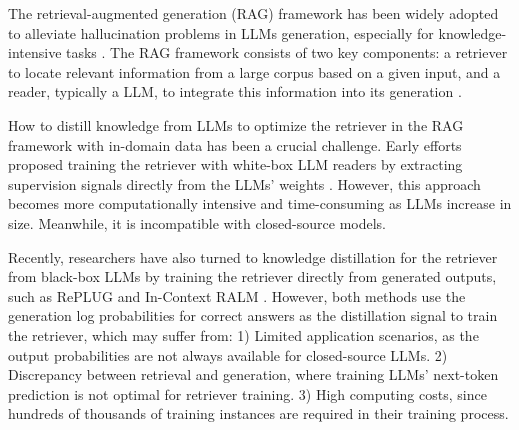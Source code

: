 The retrieval-augmented generation (RAG) framework has been widely adopted to alleviate hallucination problems in LLMs generation, especially for knowledge-intensive tasks \cite{lewis2020retrieval}. 
The RAG framework consists of two key components: a retriever to locate relevant information from a large corpus based on a given input, and a reader, typically a LLM, to integrate this information into its generation \cite{izacard2023atlas, shi2023replug}. 




How to distill knowledge from LLMs to optimize the retriever in the RAG framework with in-domain data has been a crucial challenge. 
Early efforts proposed training the retriever with white-box LLM readers by extracting supervision signals directly from the LLMs' weights \cite{izacard2023atlas, rubin2023long, guu2020retrieval}. 
However, this approach becomes more computationally intensive and time-consuming as LLMs increase in size.
Meanwhile, it is incompatible with closed-source models.

Recently, researchers have also turned to knowledge distillation for the retriever from black-box LLMs by training the retriever directly from generated outputs, such as RePLUG \cite{shi2023replug} and In-Context RALM \cite{ram2023context}. 
However, both methods use the generation log probabilities for correct answers as the distillation signal to train the retriever, which may suffer from: 
1) Limited application scenarios, as the output probabilities are not always available for closed-source LLMs. 
2) Discrepancy between retrieval and generation, where training LLMs' next-token prediction is not optimal for retriever training.
3) High computing costs, since hundreds of thousands of training instances are required in their training process.

